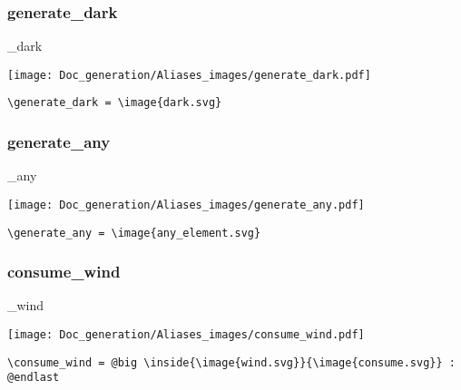 \documentclass{article}
\begin{document}
\subsubsection{generate\_dark}
\begin{minipage}{0.45\linewidth}
\raggedright
\begin{spverbatim}
\generate_dark 
\end{spverbatim}
\end{minipage}
\begin{minipage}{0.45\linewidth}
\raggedleft
\texttt{[image: Doc\_generation/Aliases\_images/generate\_dark.pdf]}
\end{minipage}
\begin{center}
\begin{BVerbatim}
\generate_dark = \image{dark.svg}
\end{BVerbatim}
\end{center}

\subsubsection{generate\_any}
\begin{minipage}{0.45\linewidth}
\raggedright
\begin{spverbatim}
\generate_any 
\end{spverbatim}
\end{minipage}
\begin{minipage}{0.45\linewidth}
\raggedleft
\texttt{[image: Doc\_generation/Aliases\_images/generate\_any.pdf]}
\end{minipage}
\begin{center}
\begin{BVerbatim}
\generate_any = \image{any_element.svg}
\end{BVerbatim}
\end{center}

\subsubsection{consume\_wind}
\begin{minipage}{0.45\linewidth}
\raggedright
\begin{spverbatim}
\consume_wind 
\end{spverbatim}
\end{minipage}
\begin{minipage}{0.45\linewidth}
\raggedleft
\texttt{[image: Doc\_generation/Aliases\_images/consume\_wind.pdf]}
\end{minipage}
\begin{center}
\begin{BVerbatim}
\consume_wind = @big \inside{\image{wind.svg}}{\image{consume.svg}} : @endlast
\end{BVerbatim}
\end{center}
\end{document}
